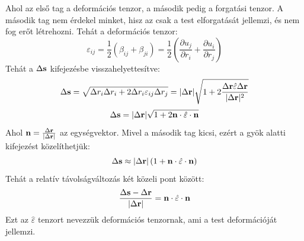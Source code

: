\documentclass[../main.tex]{subfiles}
\begin{document}
Ahol az első tag a deformációs tenzor, a második pedig a forgatási tenzor. A második tag nem érdekel minket, hisz az csak a test elforgatását jellemzi, és nem fog erőt létrehozni. Tehát a deformációs tenzor:
\begin{equation}
    \varepsilon_{ij} = \frac{1}{2} (\beta_{ij} + \beta_{ji}) = \frac{1}{2} \left(\frac{\partial u_j}{\partial r_i} + \frac{\partial u_i}{\partial r_j}\right)
\end{equation}
Tehát a $\Delta \bold{s}$ kifejezésbe visszahelyettesítve:
\begin{equation}
    \Delta \bold{s} = \sqrt{\Delta r_i \Delta r_i + 2 \Delta r_i \varepsilon_{ij} \Delta r_j} = |\Delta \bold{r}| \sqrt{1 + 2 \frac{\Delta \bold{r} \hat{\varepsilon} \Delta \bold{r}}{|\Delta \bold{r}|^2}}
\end{equation}
\begin{equation}
    \Delta \bold{s} = |\Delta \bold{r}| \sqrt{1 + 2 \bold{n} \cdot \hat{\varepsilon} \cdot \bold{n}}
\end{equation}
Ahol $\bold{n} = \frac{\Delta \bold{r}}{|\Delta \bold{r}|}$ az egységvektor. Mivel a második tag kicsi, ezért a gyök alatti kifejezést közelíthetjük:
\begin{equation}
    \Delta \bold{s} \approx |\Delta \bold{r}| \left(1 + \bold{n} \cdot \hat{\varepsilon} \cdot \bold{n}\right)
\end{equation}
Tehát a relatív távolságváltozás két közeli pont között:
\begin{equation}
    \frac{\Delta \bold{s} - \Delta \bold{r}}{|\Delta \bold{r}|} = \bold{n} \cdot \hat{\varepsilon} \cdot \bold{n}
\end{equation}
Ezt az $\hat{\varepsilon}$ tenzort nevezzük deformációs tenzornak, ami a test deformációját jellemzi.
\end{document}
